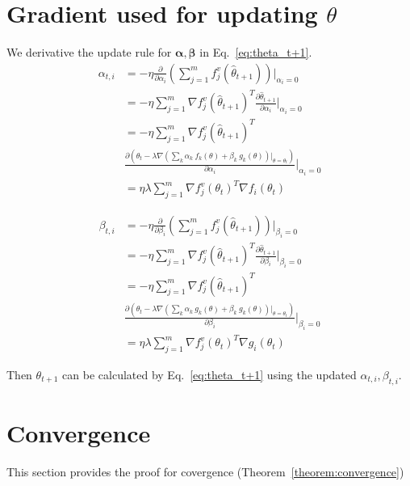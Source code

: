 \documentclass{article}
\begin{document}
\section{Gradient used for updating $\theta$}
We derivative the update rule for $\boldsymbol{\alpha},\boldsymbol{\beta}$ in Eq.~\eqref{eq:theta_t+1}. 
\begin{align}
\alpha_{t,i}&=-\eta\frac{\partial}{\partial \alpha_i}(\sum_{j=1}^m f_j^v(\hat{\theta}_{t+1}))\Big |_{\alpha_i=0} \\
&=-\eta\sum_{j=1}^m \nabla f_j^v(\hat{\theta}_{t+1})^T\frac{\partial \hat{\theta}_{t+1}}{\partial \alpha_i}\Big |_{\alpha_i=0} \\ 
&=-\eta\sum_{j=1}^m \nabla f_j^v(\hat{\theta}_{t+1})^T\\
&\frac{\partial( \theta_t - \lambda \nabla (\sum_k \alpha_k \ f_{k}(\theta)+\beta_k\ g_{k}(\theta))\Big |_{\theta=\theta_t}) }{\partial \alpha_i}\Big |_{\alpha_i=0}\\
&=\eta\lambda\sum_{j=1}^m \nabla f_j^v(\theta_t)^T \nabla f_i(\theta_t)
\end{align}

\begin{align}
\beta_{t,i}&=-\eta\frac{\partial}{\partial \beta_i}(\sum_{j=1}^m f_j^v(\hat{\theta}_{t+1}))\Big |_{\beta_i=0} \\
&=-\eta\sum_{j=1}^m \nabla f_j^v(\hat{\theta}_{t+1})^T\frac{\partial \hat{\theta}_{t+1}}{\partial \beta_i}\Big |_{\beta_i=0} \\ 
&=-\eta\sum_{j=1}^m \nabla f_j^v(\hat{\theta}_{t+1})^T \\
&\frac{\partial( \theta_t - \lambda \nabla (\sum_k \alpha_k \ g_{k}(\theta)+\beta_k\ g_{k}(\theta))\Big |_{\theta=\theta_t}) }{\partial \beta_i}\Big |_{\beta_i=0}\\
&=\eta\lambda\sum_{j=1}^m \nabla f_j^v(\theta_t)^T \nabla g_i(\theta_t)
\end{align}

Then $\theta_{t+1}$ can be calculated by Eq.~\eqref{eq:theta_t+1} using the updated $\alpha_{t,i},\beta_{t,i}$. 
\section{Convergence}
This section provides the proof for covergence (Theorem~\ref{theorem:convergence})
\end{document}
